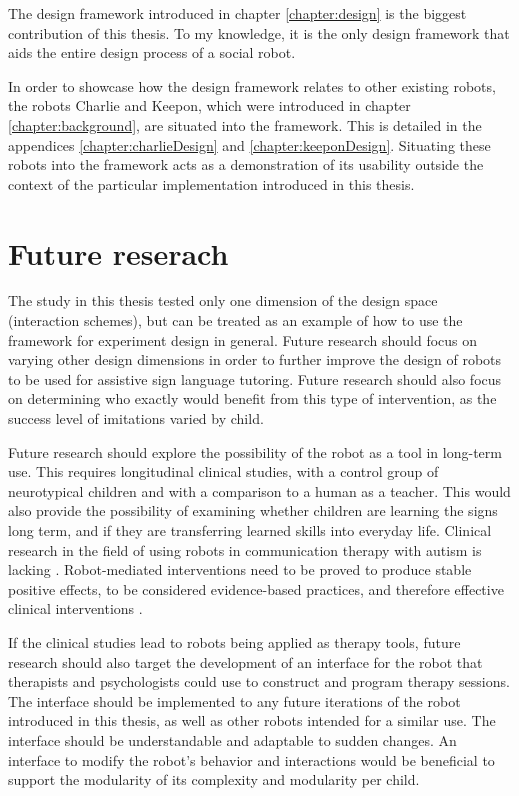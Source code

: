 The design framework introduced in chapter \ref{chapter:design} is the biggest contribution of this thesis. To my knowledge, it is the only design framework that aids the entire design process of a social robot. 

In order to showcase how the design framework relates to other existing robots, the robots Charlie and Keepon, which were introduced in chapter \ref{chapter:background}, are situated into the framework. This is detailed in the appendices \ref{chapter:charlieDesign} and \ref{chapter:keeponDesign}. Situating these robots into the framework acts as a demonstration of its usability outside the context of the particular implementation introduced in this thesis.



\section{Future reserach}

The study in this thesis tested only one dimension of the design space (interaction schemes), but can be treated as an example of how to use the framework for experiment design in general. Future research should focus on varying other design dimensions in order to further improve the design of robots to be used for assistive sign language tutoring. Future research should also focus on determining who exactly would benefit from this type of intervention, as the success level of imitations varied by child.

Future research should explore the possibility of the robot as a tool in long-term use. This requires longitudinal clinical studies, with a control group of neurotypical children and with a comparison to a human as a teacher. This would also provide the possibility of examining whether children are learning the signs long term, and if they are transferring learned skills into everyday life. Clinical research in the field of using robots in communication therapy with autism is lacking \cite{Begum2016}. Robot-mediated interventions need to be proved to produce stable positive effects, to be considered evidence-based practices, and therefore effective clinical interventions \cite{Begum2016}.

If the clinical studies lead to robots being applied as therapy tools, future research should also target the development of an interface for the robot that therapists and psychologists could use to construct and program therapy sessions. The interface should be implemented to any future iterations of the robot introduced in this thesis, as well as other robots intended for a similar use. The interface should be understandable and adaptable to sudden changes. An interface to modify the robot's behavior and interactions would be beneficial to support the modularity of its complexity and modularity per child. 

